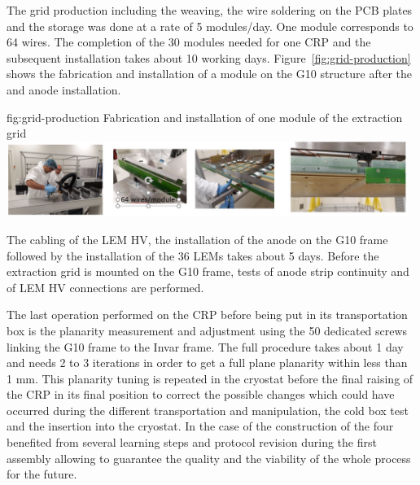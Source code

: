  The grid production including the weaving, the wire soldering on the PCB plates and the storage was done at a rate 
of 5 modules/day. One module corresponds to \num{64} wires. The completion of the 30 modules needed for one CRP and the subsequent
 installation takes about \num{10} working days. Figure~\ref{fig:grid-production} shows the fabrication and installation of
 a module on the G10 structure after the  and anode installation. 
\begin{dunefigure}
{fig:grid-production}
{Fabrication and installation of one module of the extraction grid}
\includegraphics[width=0.98\textwidth]{graphics/grid-production}
\end{dunefigure}

The cabling of the LEM HV, the installation of the anode on the G10 frame followed by the installation of the \num{36} LEMs 
takes about 5 days. Before the extraction grid is mounted on the G10 frame, tests of anode strip continuity and of LEM 
HV connections are performed.

The last operation performed on the CRP before being put in its transportation box is the planarity  measurement and adjustment using the \num{50} dedicated screws linking the G10 frame to the Invar frame. The full procedure takes about 1 day and needs 2 to 3 iterations in order to get a full plane planarity within less than 1 mm. This planarity tuning is repeated in the cryostat before the final raising of the CRP in its final position to correct the possible changes which could have occurred during the different transportation and manipulation, the cold box test and the insertion into the cryostat.
In the case of  the construction of the four  benefited from several learning steps and protocol revision during the first 
assembly allowing to guarantee the quality and the viability of the whole process for the future.



